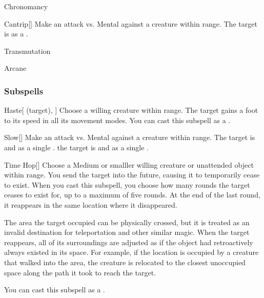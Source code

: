 \newpage
\begin{spellsection}{Chronomancy}

\begin{spellheader}
\end{spellheader}


\begin{ability}{Cantrip}[]
Make an attack vs. Mental against a creature within \rngmed range.
\hit The target is  as a .
\end{ability}




 Transmutation

 Arcane
\end{spellsection}


\subsubsection{Subspells}


\begin{ability}[\nth{1}]{Haste}[ (target), ]
Choose a willing creature within \rngmed range.
The target gains a  foot  to its speed in all its movement modes.
You can cast this subspell as a .
\end{ability}
\vspace{0.25em}


\begin{ability}[\nth{1}]{Slow}[]
Make an attack vs. Mental against a creature within \rngmed range.
\hit The target is  and  as a single .
\crit the target is  and  as a single .
\end{ability}
\vspace{0.25em}


\begin{ability}[\nth{2}]{Time Hop}[]
Choose a Medium or smalller willing creature or unattended object within \rngmed range.
You send the target into the future, causing it to temporarily cease to exist.
When you cast this subspell, you choose how many rounds the target ceases to exist for, up to a maximum of five rounds.
At the end of the last round, it reappears in the same location where it disappeared.

The area the target occupied can be physically crossed, but it is treated as an invalid destination for teleportation and other similar magic.
When the target reappears, all of its surroundings are adjusted as if the object had retroactively always existed in its space.
For example, if the location is occupied by a creature that walked into the area, the creature is relocated to the closest unoccupied space along the path it took to reach the target.

You can cast this subspell as a .
\end{ability}
\vspace{0.25em}


